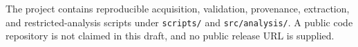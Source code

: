 The project contains reproducible acquisition, validation, provenance, extraction, and restricted-analysis scripts under \texttt{scripts/} and \texttt{src/analysis/}. A public code repository is not claimed in this draft, and no public release URL is supplied.